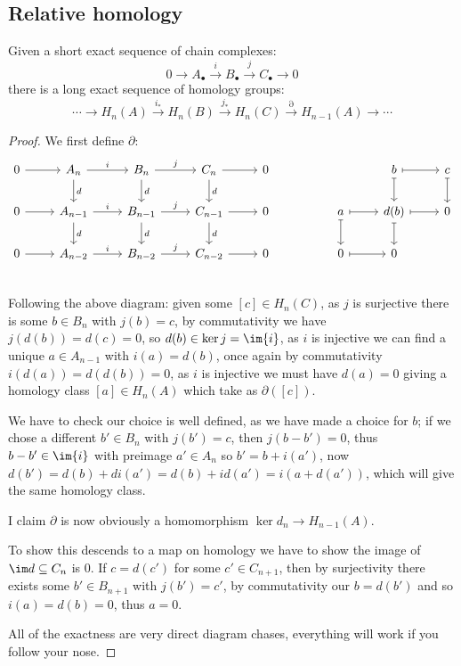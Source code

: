 \documentclass{article}
\begin{document}
\subsection{Relative homology}

\begin{lemma}
    Given a short exact sequence of chain complexes: \[
    0 \rightarrow A_\bullet \xrightarrow{i} B_\bullet \xrightarrow{j} C_\bullet \rightarrow 0
    \] there is a long exact sequence of homology groups: \[
    \cdots \rightarrow H_n(A) \xrightarrow{i_*} H_n(B) \xrightarrow{j_*} H_n(C) \xrightarrow{\partial} H_{n-1}(A) \rightarrow \cdots
    \]
    \begin{proof}
        We first define $\partial$:\[
        \begin{tikzcd}
        0 \arrow[r] & A_n \arrow[r, "i"] \arrow[d, "d"] & B_n \arrow[r, "j"] \arrow[d, "d"] & C_n \arrow[r] \arrow[d, "d"] & 0 
        & & & b \arrow[r, mapsto] \arrow[d, mapsto] & c \arrow[d, mapsto]\\
        0 \arrow[r]& A_{n-1} \arrow[r, "i"] \arrow[d, "d"] & B_{n-1} \arrow[r, "j"] \arrow[d, "d"] & C_{n-1} \arrow[r] \arrow[d, "d"] & 0 
        & & a \arrow[r,mapsto] \arrow[d, mapsto] & d(b) \arrow[r, mapsto] \arrow[d,mapsto]& 0 \\
        0 \arrow[r]& A_{n-2} \arrow[r, "i"] & B_{n-2} \arrow[r, "j"] & C_{n-2} \arrow[r]& 0 
        &  & 0 \arrow[r,mapsto] & 0\\
        \end{tikzcd}
        \] Following the above diagram: given some $[c]\in H_n(C)$, as $j$ is surjective there is some $b\in B_n$ with $j(b)=c$, by commutativity we have $j(d(b))=d(c)=0$, so $d(b)\in\ker{j}=\im{i}$, as $i$ is injective we can find a unique $a\in A_{n-1}$ with $i(a)=d(b)$, once again by commutativity $i(d(a)) = d(d(b)) = 0$, as $i$ is injective we must have $d(a) = 0$ giving a homology class $[a]\in H_n(A)$ which take as $\partial([c])$.

        We have to check our choice is well defined, as we have made a choice for $b$; if we chose a different $b'\in B_n$ with $j(b')=c$, then $j(b-b')=0$, thus $b-b'\in\im{i}$ with preimage $a'\in A_n$ so $b'=b+i(a')$, now $d(b') = d(b)+di(a') = d(b)+id(a') = i(a+d(a'))$, which will give the same homology class.

        I claim $\partial$ is now obviously a homomorphism $\ker d_{n}\rightarrow H_{n-1}(A)$.

        To show this descends to a map on homology we have to show the image of $\im d\subseteq C_n$ is $0$. If $c=d(c')$ for some $c'\in C_{n+1}$, then by surjectivity there exists some $b'\in B_{n+1}$ with $j(b')=c'$, by commutativity our $b = d(b')$ and so $i(a)=d(b)=0$, thus $a=0$.

        All of the exactness are very direct diagram chases, everything will work if you follow your nose.
    \end{proof}
\end{lemma}
\end{document}
